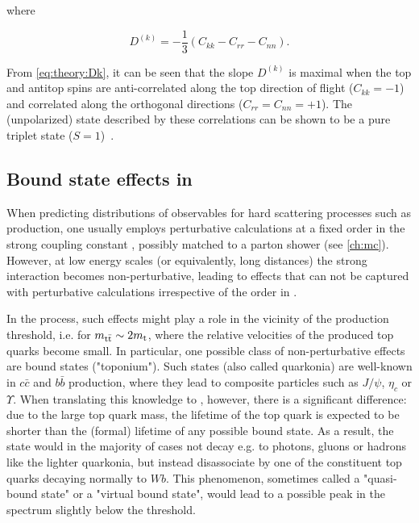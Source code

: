 \noindent where~\cite{Maltoni:2024tul}

\begin{equation}
\label{eq:theory:Dk}
    D^{(k)} = - \frac{1}{3} \left( C_{kk} - C_{rr} - C_{nn} \right) .
\end{equation}

From \cref{eq:theory:Dk}, it can be seen that the slope $D^{(k)}$ is maximal when the top and antitop spins are anti-correlated along the top direction of flight ($C_{kk} = -1$) and correlated along the orthogonal directions ($C_{rr} = C_{nn} = +1$). The (unpolarized) state described by these correlations can be shown to be a pure triplet state ($S=1$)~\cite{Maltoni:2024tul}.



\subsection{Bound state effects in \ttbartitle}
\label{sec:theory:etat}

When predicting distributions of observables for hard scattering processes such as \ttbar production, one usually employs perturbative calculations at a fixed order in the strong coupling constant \alphas, possibly matched to a parton shower (see \cref{ch:mc}). However, at low energy scales (or equivalently, long distances) the strong interaction becomes non-perturbative, leading to effects that can not be captured with perturbative calculations irrespective of the order in \alphas.

In the \pptt process, such effects might play a role in the vicinity of the \ttbar production threshold, i.e. for $m_{\mathrm{t \bar{t}}} \sim 2 m_{\mathrm{t}}$, where the relative velocities of the produced top quarks become small. In particular, one possible class of non-perturbative effects are \ttbar bound states ("toponium"). Such states (also called quarkonia) are well-known in $c \bar{c}$ and $b \bar{b}$ production, where they lead to composite particles such as $J/\psi$, $\eta_c$ or $\Upsilon$. When translating this knowledge to \ttbar, however, there is a significant difference: due to the large top quark mass, the lifetime of the top quark is expected to be shorter than the (formal) lifetime of any possible \ttbar bound state. As a result, the state would in the majority of cases not decay e.g. to photons, gluons or hadrons like the lighter quarkonia, but instead disassociate by one of the constituent top quarks decaying normally to $W b$. This phenomenon, sometimes called a "quasi-bound state" or a "virtual bound state", would lead to a possible peak in the \mWWbb spectrum slightly below the \ttbar threshold.

